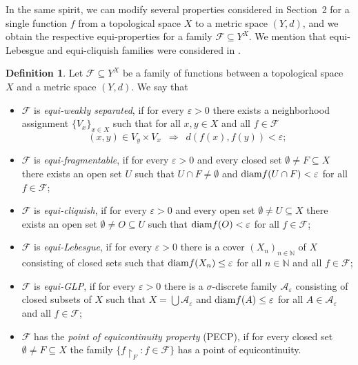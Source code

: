 \documentclass[a4paper]{amsart}
\theoremstyle{plain}
\theoremstyle{definition}
\newtheorem{definition}[theorem]{Definition}
\theoremstyle{remark}
\numberwithin{equation}{section}
\begin{document}
    In the same spirit, we can modify several properties considered in Section~2 for a single function $f$ from a topological space $X$ to a metric space $(Y,d)$, and we obtain the respective equi-properties for a family 
    $\mathcal F\subseteq Y^X$. We mention that equi-Lebesgue 
    and equi-cliquish families were considered in \cite{BHH}.
    
	\begin{definition} \label{defi}
		Let $\mathcal F\subseteq Y^X$ be a family of functions between a topological space $X$ and a metric space $(Y,d)$. We say that     
		\begin{itemize}
			\item $\mathcal F$ is \emph{equi-weakly separated}, if for every $\varepsilon>0$ there exists a neighborhood assignment $\{V_x\}_{x\in X}$ such that for all $x,y\in X$ and all $f\in\mathcal F$
				\begin{equation*} 
					(x,y)\in V_{y}\times V_{x} \,\,\,\Longrightarrow\,\,\, d(f(x),f(y))<\varepsilon;
				\end{equation*} 
			
			
			\item $\mathcal F$ is \emph{equi-fragmentable}, if
				 for every  $\varepsilon>0$ and every closed set $\emptyset\ne F\subseteq X$ there exists an open set $U$ such that $U\cap F\neq\emptyset$ and ${\rm diam} f(U\cap F)<\varepsilon$ for all $f\in\mathcal F$;
			
		    \item $\mathcal F$ is \emph{equi-cliquish}, if  
		     for every  $\varepsilon>0$ and every  open set $\emptyset\ne U\subseteq X$ there exists an open set $\emptyset\ne O\subseteq U$ such that  ${\rm diam} f(O)<\varepsilon$ for all $f\in\mathcal F$;
		    
            
			
			\item $\mathcal F$ is \emph{equi-Lebesgue}, if 
			for every $\varepsilon >0$ there is a cover 
				$(X_n)_{n\in\mathbb N}$ of $X$ consisting of closed sets such that ${\rm diam}f(X_n)\le\varepsilon$ for all $n\in\mathbb N$
                and all $f\in\mathcal F$;
		
						
			\item $\mathcal F$ is \emph{equi-GLP}, if
			for every $\varepsilon >0$ there is a $\sigma$-discrete family $\mathcal A_\varepsilon$ consisting of closed subsets of $X$ such that $X=\bigcup \mathcal A_\varepsilon$ and ${\rm diam}f(A)\le\varepsilon$ for all $A\in\mathcal A_\varepsilon$ and all $f\in\mathcal F$;
		

			\item $\mathcal F$ has the \emph{point of equicontinuity property} (PECP), if for every closed set $\emptyset\ne F\subseteq X$ the family $\{f\restriction_F\colon f\in\mathcal F\}$ has a point of equicontinuity.		
		\end{itemize}
	\end{definition}
\end{document}
